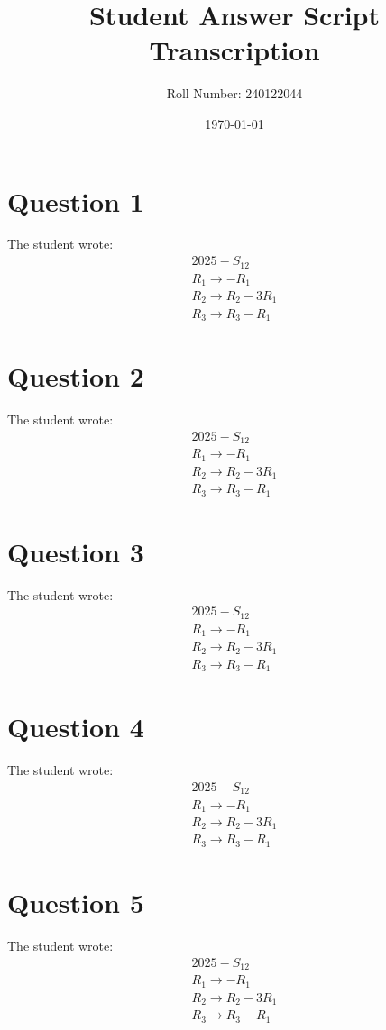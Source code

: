 \documentclass[12pt]{article}
\title{Student Answer Script Transcription}
\author{Roll Number: 240122044}
\date{\today}
\begin{document}
\maketitle

\section*{Question 1}
The student wrote:
\[
\begin{array}{l}
2025-S_{12} \\
R_{1} \rightarrow -R_{1} \\
R_{2} \rightarrow R_{2}-3R_{1} \\
R_{3} \rightarrow R_{3}-R_{1}
\end{array}
\]

\section*{Question 2}
The student wrote:
\[
\begin{array}{l}
2025-S_{12} \\
R_{1} \rightarrow -R_{1} \\
R_{2} \rightarrow R_{2}-3R_{1} \\
R_{3} \rightarrow R_{3}-R_{1}
\end{array}
\]

\section*{Question 3}
The student wrote:
\[
\begin{array}{l}
2025-S_{12} \\
R_{1} \rightarrow -R_{1} \\
R_{2} \rightarrow R_{2}-3R_{1} \\
R_{3} \rightarrow R_{3}-R_{1}
\end{array}
\]

\section*{Question 4}
The student wrote:
\[
\begin{array}{l}
2025-S_{12} \\
R_{1} \rightarrow -R_{1} \\
R_{2} \rightarrow R_{2}-3R_{1} \\
R_{3} \rightarrow R_{3}-R_{1}
\end{array}
\]

\section*{Question 5}
The student wrote:
\[
\begin{array}{l}
2025-S_{12} \\
R_{1} \rightarrow -R_{1} \\
R_{2} \rightarrow R_{2}-3R_{1} \\
R_{3} \rightarrow R_{3}-R_{1}
\end{array}
\]
\end{document}
